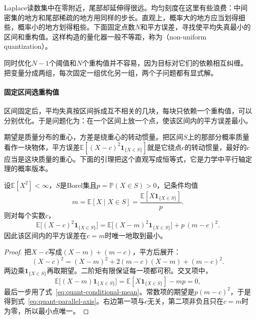 Laplace读数集中在零附近，尾部却延伸得很远。均匀刻度在这里有些浪费：中间密集的地方和尾部稀疏的地方用同样的步长。直观上，概率大的地方应当划得细些，概率小的地方划得粗些。下面固定点数$N$和平方误差，寻找使平均失真最小的区间和重构值。这样构造的量化器一般不等距，称为（non-uniform quantization）。

同时优化$N-1$个阈值和$N$个重构值并不容易，因为目标对它们的依赖相互纠缠。把变量分成两组，每次固定一组优化另一组，两个子问题都有显式解。

\paragraph{固定区间选重构值}
区间固定后，平均失真按区间拆成互不相关的几块，每块只依赖一个重构值，可以分别优化。于是问题化为：在一个区间上放一个点，使该区间内的平方误差最小。

期望是质量分布的重心，方差是绕重心的转动惯量。把区间$S$上的那部分概率质量看作一块物体，平方误差$\mathbb{E}[(X-c)^2\mathbf{1}_{\{X\in S\}}]$就是它绕点$c$的转动惯量，最好的$c$应当是这块质量的重心。下面的引理把这个直观写成恒等式，它是力学中平行轴定理的概率版本。

\begin{lemma}[质心条件]
\label{lem:quant-centroid}
设$\mathbb{E}[X^{2}]<\infty$，$S$是Borel集且$p=\mathbb{P}(X\in S)>0$，记条件均值
\begin{equation}
 m=\mathbb{E}[X\mid X\in S]=\frac{\mathbb{E}[X\mathbf{1}_{\{X\in S\}}]}{p} .
 \label{eq:quant-conditional-mean}
\end{equation}
则对每个实数$c$，
\begin{equation}
 \mathbb{E}\bigl[(X-c)^{2}\mathbf{1}_{\{X\in S\}}\bigr]=\mathbb{E}\bigl[(X-m)^{2}\mathbf{1}_{\{X\in S\}}\bigr]+p\,(m-c)^{2} .
 \label{eq:quant-parallel-axis}
\end{equation}
因此该区间内的平方误差在$c=m$时唯一地取到最小。
\end{lemma}

\begin{proof}
把$X-c$写成$(X-m)+(m-c)$，平方后展开：
\[
 (X-c)^{2}=(X-m)^{2}+2(m-c)(X-m)+(m-c)^{2} .
\]
两边乘$\mathbf{1}_{\{X\in S\}}$再取期望。二阶矩有限保证每一项都可积。交叉项中，
\[
 \mathbb{E}\bigl[(X-m)\mathbf{1}_{\{X\in S\}}\bigr]=\mathbb{E}[X\mathbf{1}_{\{X\in S\}}]-mp=0 ,
\]
最后一步用了式~\eqref{eq:quant-conditional-mean}。常数项的期望是$p(m-c)^{2}$，于是得到式~\eqref{eq:quant-parallel-axis}。右边第一项与$c$无关，第二项非负且只在$c=m$时为零，所以最小点唯一。
\end{proof}

